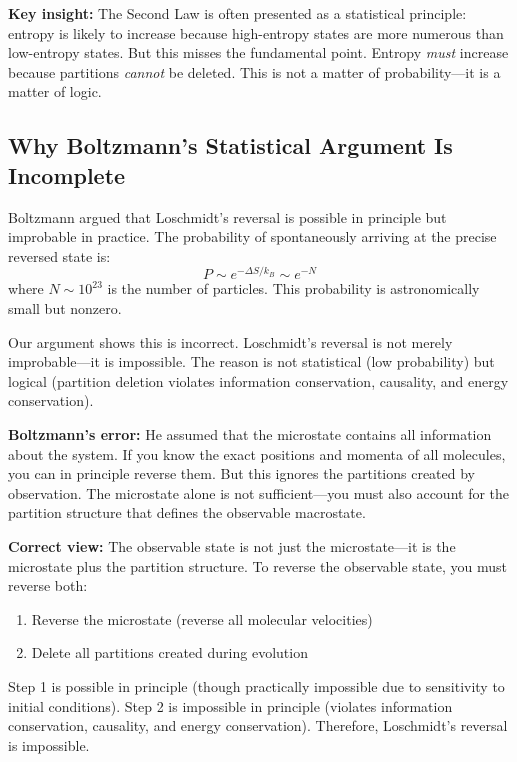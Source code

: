 \documentclass[twocolumn,10pt]{article}
\theoremstyle{definition}
\theoremstyle{remark}
\begin{document}
\noindent\textbf{Key insight:} The Second Law is often presented as a statistical principle: entropy is likely to increase because high-entropy states are more numerous than low-entropy states. But this misses the fundamental point. Entropy \textit{must} increase because partitions \textit{cannot} be deleted. This is not a matter of probability—it is a matter of logic.

\subsection{Why Boltzmann's Statistical Argument Is Incomplete}

Boltzmann argued that Loschmidt's reversal is possible in principle but improbable in practice. The probability of spontaneously arriving at the precise reversed state is:
\begin{equation}
P \sim e^{-\Delta S / k_B} \sim e^{-N}
\end{equation}
where $N \sim 10^{23}$ is the number of particles. This probability is astronomically small but nonzero.

\vspace{0.2cm}
\noindent Our argument shows this is incorrect. Loschmidt's reversal is not merely improbable—it is impossible. The reason is not statistical (low probability) but logical (partition deletion violates information conservation, causality, and energy conservation).

\vspace{0.2cm}
\noindent\textbf{Boltzmann's error:} He assumed that the microstate contains all information about the system. If you know the exact positions and momenta of all molecules, you can in principle reverse them. But this ignores the partitions created by observation. The microstate alone is not sufficient—you must also account for the partition structure that defines the observable macrostate.

\vspace{0.2cm}
\noindent\textbf{Correct view:} The observable state is not just the microstate—it is the microstate plus the partition structure. To reverse the observable state, you must reverse both:
\begin{enumerate}
\item Reverse the microstate (reverse all molecular velocities)
\item Delete all partitions created during evolution
\end{enumerate}

Step 1 is possible in principle (though practically impossible due to sensitivity to initial conditions). Step 2 is impossible in principle (violates information conservation, causality, and energy conservation). Therefore, Loschmidt's reversal is impossible.
\end{document}
